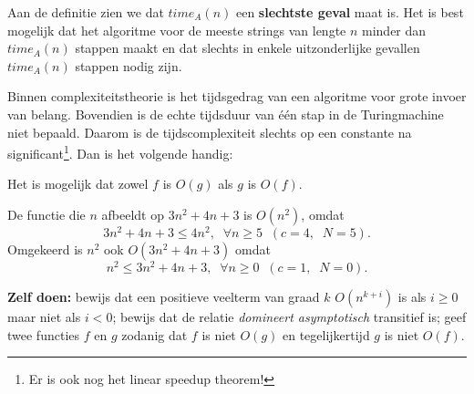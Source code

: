 Aan de definitie zien we dat $time_A(n)$ een {\bf slechtste geval}
maat is. Het is best mogelijk dat het algoritme voor de meeste strings
van lengte $n$ minder dan $time_A(n)$ stappen maakt en dat
slechts in enkele uitzonderlijke gevallen $time_A(n)$ stappen nodig
zijn.

Binnen complexiteitstheorie is het tijdsgedrag van een algoritme voor
grote invoer van belang. Bovendien is de echte tijdsduur van \'{e}\'{e}n
stap in de Turingmachine niet bepaald. Daarom is de
tijdscomplexiteit slechts op een constante na significant\footnote{Er
  is ook nog het linear speedup theorem!}. Dan is het volgende
handig:


 

Het is mogelijk dat zowel $f$ is $O(g)$ als $g$ is $O(f)$.

\begin{vb}{
De functie die $n$ afbeeldt op $3n^2+4n +3$ is $O(n^2)$, omdat
\[ 3 n^2+4n +3 \leq 4 n^2,\;\; \forall n\geq 5 \;\;(c=4,\;\;N=5).\]
Omgekeerd is $n^2$ ook $O(3n^2+4n +3)$ omdat
\[ n^2 \leq 3 n^2+4n+3,\;\; \forall n\geq 0 \;\; (c=1,\;\; N=0). \]
}
\end{vb}

{\bf Zelf doen:} bewijs dat een positieve veelterm van graad $k$ 
$O(n^{k+i})$ is als $i \geq 0$ maar niet als $i < 0$; bewijs dat de
relatie {\em domineert asymptotisch} transitief is; geef twee functies
$f$ en $g$ zodanig dat $f$ is niet $O(g)$ en tegelijkertijd $g$ is
niet $O(f)$.






